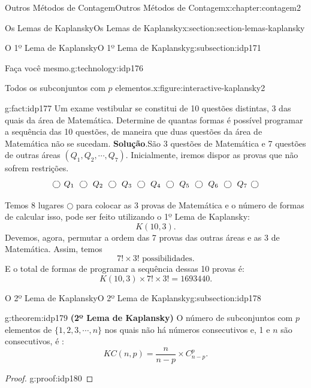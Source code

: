 \documentclass[oneside,10pt,]{book}
\newcommand{\blocktitlefont}{\relax}
\newcommand{\terminology}[1]{\textbf{#1}}
\numberwithin{equation}{section}
\begin{document}
\begin{chapterptx}{Outros Métodos de Contagem}{}{Outros Métodos de Contagem}{}{}{x:chapter:contagem2}
\begin{sectionptx}{Os Lemas de Kaplansky}{}{Os Lemas de Kaplansky}{}{}{x:section:section-lemas-kaplansky}
\begin{subsectionptx}{O 1º Lema de Kaplansky}{}{O 1º Lema de Kaplansky}{}{}{g:subsection:idp171}
\begin{technology}{Faça você mesmo.}{g:technology:idp176}
\begin{figureptx}{Todos os subconjuntos com \(p\) elementos.}{x:figure:interactive-kaplansky2}{}
\tcblower
\end{figureptx}%
\end{technology}
\begin{fact}{}{}{g:fact:idp177}%
Um exame vestibular se constitui de 10 questões distintas, 3 das quais da área de Matemática. Determine de quantas formas é possível programar a sequência das 10 questões, de maneira que duas questões da área de Matemática não se sucedam.%
\textbf{\blocktitlefont Solução}.\quad{}São 3 questões de Matemática e 7 questões de outras áreas \((Q_1, Q_2,\cdots, Q_7)\). Inicialmente, iremos dispor as provas que não sofrem restrições.%
\begin{equation*}
\large\bigcirc \ Q_1\ \bigcirc \ Q_2 \ \bigcirc \ Q_3 \ \bigcirc \ Q_4 \ \bigcirc \ Q_5 \ \bigcirc \ Q_6 \  \bigcirc \ Q_7 \ \bigcirc
\end{equation*}
%
\par
Temos 8 lugares \(\bigcirc\) para colocar as 3 provas de Matemática e o número de formas de calcular isso, pode ser feito utilizando o 1º Lema de Kaplansky:%
\begin{equation*}
K(10,3).
\end{equation*}
Devemos, agora, permutar a ordem das 7 provas das outras áreas e as 3 de Matemática. Assim, temos%
\begin{equation*}
7! \times 3! \text{ possibilidades.}
\end{equation*}
E o total de formas de programar a sequência dessas 10 provas é:%
\begin{equation*}
K(10, 3)\times 7! \times 3! = 1693440. 
\end{equation*}
%
\end{fact}
\end{subsectionptx}
%
%
\typeout{************************************************}
\typeout{************************************************}
%
\begin{subsectionptx}{O 2º Lema de Kaplansky}{}{O 2º Lema de Kaplansky}{}{}{g:subsection:idp178}
\begin{theorem}{}{}{g:theorem:idp179}%
\terminology{(2º Lema de Kaplansky)} O número de subconjuntos com \(p\) elementos de \(\{1,2,3,\cdots,n\}\) nos quais não há números consecutivos e, 1 e \(n\) são consecutivos, é :%
\begin{equation*}
KC(n,p)=\frac{n}{n-p}\times C_{n-p}^p.
\end{equation*}
%
\end{theorem}
\begin{proof}{}{g:proof:idp180}

\end{proof}
\end{subsectionptx}
\end{sectionptx}
\end{chapterptx}
\end{document}
